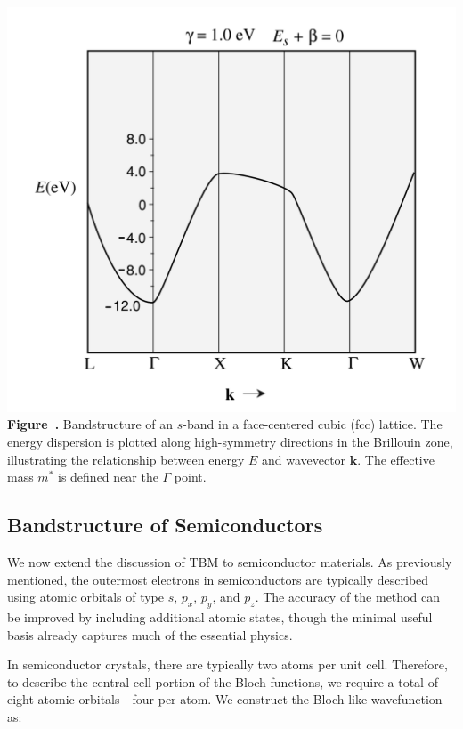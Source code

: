 \begin{center}
	\begin{minipage}{0.6\textwidth}
		\centering
		\includegraphics[width=\textwidth]{img/s-band-model.png}
		\\[0.5em]
		\textbf{Figure~\thefigure.} Bandstructure of an \(s\)-band in a face-centered cubic (fcc) lattice. The energy dispersion is plotted along high-symmetry directions in the Brillouin zone, illustrating the relationship between energy \( E \) and wavevector \( \mathbf{k} \). The effective mass \( m^* \) is defined near the \( \Gamma \) point.
		\label{fig:s-band-model}
	\end{minipage}
\end{center}


\subsection{Bandstructure of Semiconductors}
We now extend the discussion of TBM to semiconductor materials. As previously mentioned, the outermost electrons in semiconductors are typically described using atomic orbitals of type \( s \), \( p_x \), \( p_y \), and \( p_z \). The accuracy of the method can be improved by including additional atomic states, though the minimal useful basis already captures much of the essential physics.

In semiconductor crystals, there are typically two atoms per unit cell. Therefore, to describe the central-cell portion of the Bloch functions, we require a total of eight atomic orbitals—four per atom. We construct the Bloch-like wavefunction as:

